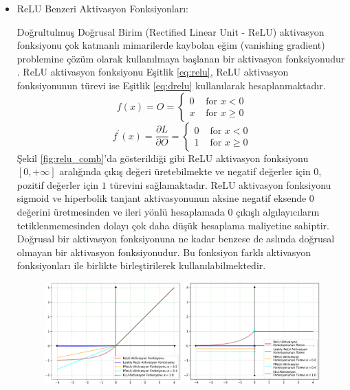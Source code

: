 \begin{itemize}
    \item ReLU Benzeri Aktivasyon Fonksiyonları:
    
    Doğrultulmuş Doğrusal Birim (Rectified Linear Unit - ReLU) aktivasyon fonksiyonu çok katmanlı mimarilerde kaybolan eğim (vanishing gradient) problemine çözüm olarak kullanılmaya başlanan bir aktivasyon fonksiyonudur \cite{hochreiter1998vanishing}. ReLU aktivasyon fonksiyonu Eşitlik \ref{eq:relu}, ReLU aktivasyon fonksiyonunun türevi ise  Eşitlik \ref{eq:drelu} kullanılarak hesaplanmaktadır.
    {\setlength{\mathindent}{0cm}
    \begin{equation}
    	\label{eq:relu}
    	f(x)= O = \left\{\begin{array}{ll}
    		0 & \text { for } x<0 \\
    		x & \text { for } x \geq 0
    	\end{array}\right.
    \end{equation}
    \vspace{-1cm}
    \begin{equation}
    	\label{eq:drelu}
    	f^{\prime}(x)= \frac{\partial L}{\partial  O} = \left\{\begin{array}{ll}
    		0 & \text { for } x<0 \\
    		1 & \text { for } x \geq 0
    	\end{array}\right.
    \end{equation}}    
    Şekil \ref{fig:relu_comb}'da gösterildiği gibi ReLU aktivasyon fonksiyonu $[0,+\infty]$ aralığında çıkış değeri üretebilmekte ve negatif değerler için $0$, pozitif değerler için $1$ türevini sağlamaktadır. ReLU aktivasyon fonksiyonu sigmoid ve hiperbolik tanjant aktivasyonunun aksine negatif eksende $0$ değerini üretmesinden ve ileri yönlü hesaplamada $0$ çıkışlı algılayıcıların tetiklenmemesinden dolayı çok daha düşük hesaplama maliyetine sahiptir. Doğrusal bir aktivasyon fonksiyonuna ne kadar benzese de aslında doğrusal olmayan bir aktivasyon fonksiyonudur. Bu fonksiyon farklı aktivasyon fonksiyonları ile birlikte birleştirilerek kullanılabilmektedir.
    
    \begin{figure}[h!]
    	\begin{center}
    		\vspace{0.4cm}
    		{
    			\vspace{0.4cm}
    			\includegraphics[scale=0.45]{Yapilan-Calismalar/Figures/relu_comb.pdf}
    		}
    	\end{center}
    \end{figure}
    

\end{itemize}
